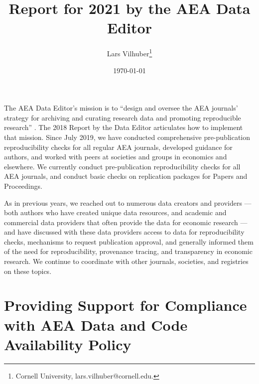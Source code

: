 \documentclass[PP]{AEA}
\begin{document}
\title{Report for 2021 by the AEA Data Editor }
\author{Lars Vilhuber\thanks{%
Cornell University, lars.vilhuber@cornell.edu. }
}
\date{\today}
\pubVolume{--}
\pubIssue{--}
\JEL{}




\maketitle

The \ac{AEA} Data Editor's  mission is to ``design  and  oversee  the  AEA  journals’  strategy for archiving and curating research data and promoting  reproducible  research'' \citep{10.1257/pandp.108.745}. The 2018 Report by the Data Editor \citep{10.1257/pandp.109.718} articulates how to implement that mission. 
Since July 2019, we have conducted comprehensive pre-publication reproducibility checks for all regular AEA journals, developed guidance for authors, and worked with peers at societies and groups in economics and elsewhere. We currently conduct  pre-publication reproducibility checks for all AEA journals, and conduct  basic checks on replication packages for Papers and Proceedings. 


As in previous years, we  reached out to numerous data creators and providers --- both authors who have created unique data resources, and academic and commercial data providers that often provide the data for economic research --- and have discussed with these data providers access to data for reproducibility checks, mechanisms to request publication approval, and generally informed them of the need for reproducibility, provenance tracing, and transparency in economic research.
We continue to coordinate with other journals, societies, and registries on these topics.


\section{Providing Support for Compliance with AEA Data and Code Availability Policy}
\label{sec:dcap}
\end{document}
